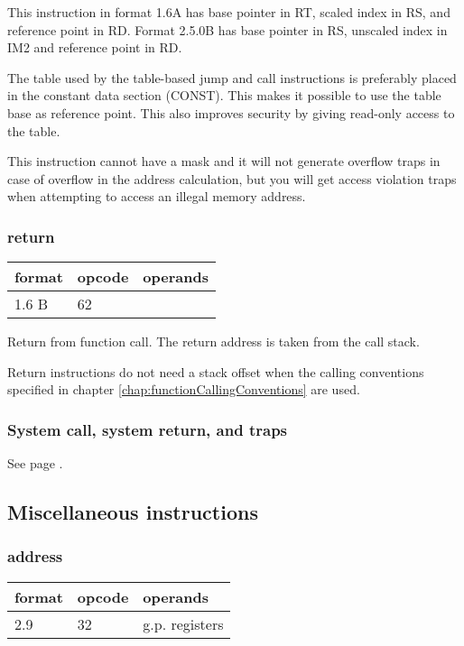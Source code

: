 \documentclass[forwardcom.tex]{subfiles}
\begin{document}
This instruction in format 1.6A has base pointer in RT, scaled index in RS, and reference point in RD. Format 2.5.0B has base pointer in RS, unscaled index in IM2 and reference point in RD.
\vspace{2mm}

The table used by the table-based jump and call instructions is preferably placed in the constant data section (CONST). This makes it possible to use the table base as reference point. This also improves security by giving read-only access to the table.
\vspace{2mm}

This instruction cannot have a mask and it will not generate overflow traps in case of overflow in the address calculation, but you will get access violation traps when attempting to access an illegal memory address.
\vspace{2mm}


\subsubsection{return}
\label{table:returnInstruction}
\begin{tabular}{|p{14mm}|p{12mm}|p{110mm}|}
\hline
\bfseries format & \bfseries opcode & \bfseries operands \\ \hline
1.6 B & 62 & \\ \hline
\end{tabular}
\vspace{2mm}

Return from function call. The return address is taken from the call stack.
\vspace{2mm}

Return instructions do not need a stack offset when the calling conventions specified in chapter \ref{chap:functionCallingConventions} are used.


\subsubsection{System call, system return, and traps}
See page \pageref{table:sysCallInstruction}.
\vspace{2mm}


\subsection{Miscellaneous instructions}

\subsubsection{address}
\label{table:addressInstruction}
\begin{tabular}{|p{12mm}|p{12mm}|p{110mm}|}
\hline
\bfseries format & \bfseries opcode & \bfseries operands \\ \hline
2.9 & 32 & g.p. registers \\ \hline
\end{tabular}
\vspace{2mm}
\end{document}
